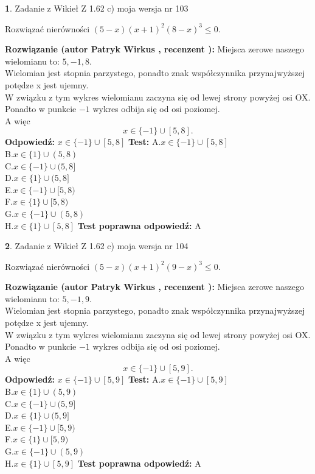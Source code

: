 \documentclass[12pt, a4paper]{article}
\theoremstyle{definition} %
\newtheorem{zad}{}
\newcommand{\zadStart}[1]{\begin{zad}#1\newline}
\newcommand{\zadStop}{\end{zad}}
\newcommand{\rozwStart}[2]{\noindent \textbf{Rozwiązanie (autor #1 , recenzent #2): }\newline}
\newcommand{\rozwStop}{\newline}
\newcommand{\odpStart}{\noindent \textbf{Odpowiedź:}\newline}
\newcommand{\odpStop}{\newline}
\newcommand{\testStart}{\noindent \textbf{Test:}\newline}
\newcommand{\testStop}{\newline}
\newcommand{\kluczStart}{\noindent \textbf{Test poprawna odpowiedź:}\newline}
\newcommand{\kluczStop}{\newline}
\begin{document}
\zadStart{Zadanie z Wikieł Z 1.62 c) moja wersja nr 103}

Rozwiązać nierówności $(5-x)(x+1)^{2}(8-x)^{3}\le0$.
\zadStop
\rozwStart{Patryk Wirkus}{}
Miejsca zerowe naszego wielomianu to: $5, -1, 8$.\\
Wielomian jest stopnia parzystego, ponadto znak współczynnika przy\linebreak najwyższej potędze x jest ujemny.\\ W związku z tym wykres wielomianu zaczyna się od lewej strony powyżej osi OX.\\
Ponadto w punkcie $-1$ wykres odbija się od osi poziomej.\\
A więc $$x \in \{-1\} \cup [5,8].$$
\rozwStop
\odpStart
$x \in \{-1\} \cup [5,8]$
\odpStop
\testStart
A.$x \in \{-1\} \cup [5,8]$\\
B.$x \in \{1\} \cup (5,8)$\\
C.$x \in \{-1\} \cup (5,8]$\\
D.$x \in \{1\} \cup (5,8]$\\
E.$x \in \{-1\} \cup [5,8)$\\
F.$x \in \{1\} \cup [5,8)$\\
G.$x \in \{-1\} \cup (5,8)$\\
H.$x \in \{1\} \cup [5,8]$
\testStop
\kluczStart
A
\kluczStop



\zadStart{Zadanie z Wikieł Z 1.62 c) moja wersja nr 104}

Rozwiązać nierówności $(5-x)(x+1)^{2}(9-x)^{3}\le0$.
\zadStop
\rozwStart{Patryk Wirkus}{}
Miejsca zerowe naszego wielomianu to: $5, -1, 9$.\\
Wielomian jest stopnia parzystego, ponadto znak współczynnika przy\linebreak najwyższej potędze x jest ujemny.\\ W związku z tym wykres wielomianu zaczyna się od lewej strony powyżej osi OX.\\
Ponadto w punkcie $-1$ wykres odbija się od osi poziomej.\\
A więc $$x \in \{-1\} \cup [5,9].$$
\rozwStop
\odpStart
$x \in \{-1\} \cup [5,9]$
\odpStop
\testStart
A.$x \in \{-1\} \cup [5,9]$\\
B.$x \in \{1\} \cup (5,9)$\\
C.$x \in \{-1\} \cup (5,9]$\\
D.$x \in \{1\} \cup (5,9]$\\
E.$x \in \{-1\} \cup [5,9)$\\
F.$x \in \{1\} \cup [5,9)$\\
G.$x \in \{-1\} \cup (5,9)$\\
H.$x \in \{1\} \cup [5,9]$
\testStop
\kluczStart
A
\kluczStop
\end{document}
